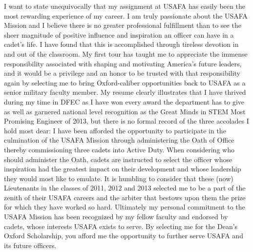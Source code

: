 \documentclass{article}
\begin{document}
I want to state unequivocally that my assignment at USAFA has easily been the
most rewarding experience of my career. I am truly passionate about the USAFA
Mission and I believe there is no greater professional fulfillment than to see
the sheer magnitude of positive influence and inspiration an officer can have
in a cadet's life. I have found that this is accomplished through tireless
devotion in and out of the classroom. My first tour has taught me to appreciate
the immense responsibility associated with shaping and motivating America's
future leaders, and it would be a privilege and an honor to be trusted with
that responsibility again by selecting me to bring Oxford-caliber opportunities
back to USAFA as a senior military faculty member. My resume clearly illustrates that I have thrived during my time in DFEC as I
have won every award the department has to give as well as garnered national
level recognition as the Great Minds in STEM Most Promising Engineer of 2013,
but there is no formal record of the three accolades I hold most dear: I have been
afforded the opportunity to participate in the culmination of the USAFA Mission
through administering the Oath of Office thereby commissioning three cadets into
Active Duty. When considering who should administer the Oath, cadets are
instructed to select the officer whose inspiration had the greatest impact on
their development and whose leadership they would most like to emulate. It is
humbling to consider that these (now) Lieutenants in the classes of 2011, 2012
and 2013 selected me to be a part of the zenith of their USAFA careers and the
arbiter that bestows upon them the prize for which they have worked so hard.
Ultimately my personal commitment to the USAFA Mission has been recognized by
my fellow faculty and endorsed by cadets, whose interests USAFA exists to
serve. By selecting me for the Dean's Oxford Scholarship, you afford me the opportunity
to further serve USAFA and its future officers.

\end{document}
